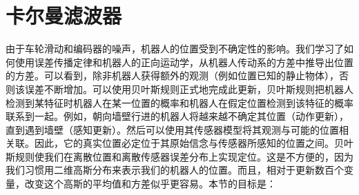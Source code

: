 
\section {卡尔曼滤波器}

由于车轮滑动和编码器的噪声，机器人的位置受到不确定性的影响。我们学习了如何使用误差传播定律和机器人的正向运动学，从机器人传动系的方差中推导出位置的方差。可以看到，除非机器人获得额外的观测（例如位置已知的静止物体），否则该误差不断增加。可以使用贝叶斯规则正式地完成此更新，贝叶斯规则把机器人检测到某特征时机器人在某一位置的概率和机器人在假定位置检测到该特征的概率联系到一起。例如，朝向墙壁行进的机器人将越来越不确定其位置（动作更新），直到遇到墙壁（感知更新）。然后可以使用其传感器模型将其观测与可能的位置相关联。因此，它的真实位置必定位于其原始信念与传感器所感知的位置之间。贝叶斯规则使我们在离散位置和离散传感器误差分布上实现定位。这是不方便的，因为我们习惯用二维高斯分布来表示我们的机器人的位置。而且，相对于更新数百个变量，改变这个高斯的平均值和方差似乎更容易。本节的目标是：

